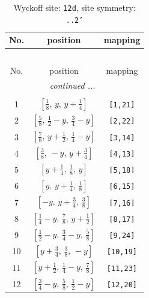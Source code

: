 \documentclass[fleqn,8pt]{jsarticle}
\begin{document}
\begin{longtable}{ccc}
\caption{Wyckoff site: {\tt 12d}, site symmetry: {\tt ..2'}}
 \\
 \hline \hline
No. & position & mapping \\ \hline \endfirsthead

\multicolumn{2}{l}{\tablename\ \thetable{}} \\
 \hline \hline
No. & position & mapping \\ \hline \endhead

 \hline \hline
\multicolumn{2}{r}{\footnotesize\it continued ...} \\ \endfoot

 \hline \hline
\multicolumn{2}{r}{} \\ \endlastfoot

1 & $\left[ \frac{1}{8},\, y,\, y + \frac{1}{4} \right]$ & {\tt [1,21]} \\ \hline
2 & $\left[ \frac{5}{8},\, \frac{1}{2} - y,\, \frac{3}{4} - y \right]$ & {\tt [2,22]} \\ \hline
3 & $\left[ \frac{7}{8},\, y + \frac{1}{2},\, \frac{1}{4} - y \right]$ & {\tt [3,14]} \\ \hline
4 & $\left[ \frac{3}{8},\, - y,\, y + \frac{3}{4} \right]$ & {\tt [4,13]} \\ \hline
5 & $\left[ y + \frac{1}{4},\, \frac{1}{8},\, y \right]$ & {\tt [5,18]} \\ \hline
6 & $\left[ y,\, y + \frac{1}{4},\, \frac{1}{8} \right]$ & {\tt [6,15]} \\ \hline
7 & $\left[ - y,\, y + \frac{3}{4},\, \frac{3}{8} \right]$ & {\tt [7,16]} \\ \hline
8 & $\left[ \frac{1}{4} - y,\, \frac{7}{8},\, y + \frac{1}{2} \right]$ & {\tt [8,17]} \\ \hline
9 & $\left[ \frac{1}{2} - y,\, \frac{3}{4} - y,\, \frac{5}{8} \right]$ & {\tt [9,24]} \\ \hline
10 & $\left[ y + \frac{3}{4},\, \frac{3}{8},\, - y \right]$ & {\tt [10,19]} \\ \hline
11 & $\left[ y + \frac{1}{2},\, \frac{1}{4} - y,\, \frac{7}{8} \right]$ & {\tt [11,23]} \\ \hline
12 & $\left[ \frac{3}{4} - y,\, \frac{5}{8},\, \frac{1}{2} - y \right]$ & {\tt [12,20]} \\
\end{longtable}
\renewcommand{\arraystretch}{1.2}
\end{document}

